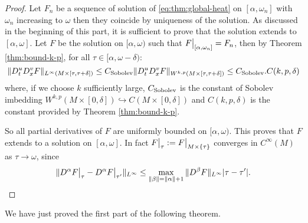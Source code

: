 \begin{proof}
Let \(F_n\) be a sequence of solution of \eqref{eq:thm:global-heat} on \([\alpha,\omega_n]\) with \(\omega_n\) increasing to \(\omega\) then they coincide by
uniqueness of the solution. As discussed in the beginning of this part, it is
sufficient to prove that the solution extends to \([\alpha,\omega]\). Let \(F\) be the
solution on \([\alpha,\omega)\) such that \(\restr{F}{[\alpha,\omega_n]} = F_n\), then
by Theorem \ref{thm:bound-k-p}, for all \(\tau \in [\alpha,\omega-\delta)\):
\[
 \| D^u_t D^v_x F \|_{L^\infty(M\times[\tau,\tau+\delta])} \leq C_{\rm Sobolev} \| D^u_t D^v_x F
\|_{W^{k,p}(M\times[\tau,\tau+\delta])} \leq C_{\rm Sobolev} . C(k,p,\delta)
\]
where, if we choose \(k\) sufficiently large, \(C_{\rm Sobolev}\) is the constant of Sobolev imbedding \(W^{k,p}(M\times[0,\delta]) \hookrightarrow C(M\times[0,\delta])\) and \(C(k,p,\delta)\)
is the constant provided by Theorem \ref{thm:bound-k-p}. 

So all partial derivatives of \(F\) are uniformly bounded on \([\alpha,\omega)\). This proves that \(F\) extends
to a solution on \([\alpha,\omega]\). In fact \(\restr{F}{\tau}:=\restr{F}{M\times\{\tau\}}\) converges
in \(C^\infty(M)\) as \(\tau\to \omega\), since 
\[ \|D^\alpha \restr{F}{\tau} -
D^\alpha\restr{F}{\tau'}\|_{L^\infty} \leq \max_{\|\beta\| =
\|\alpha\|+1}\|D^{\beta}F\|_{L^\infty}|\tau-\tau'|. 
\]
\end{proof}

We have just proved the first part of the following theorem.


